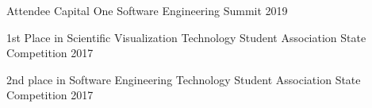 




\begin{cvhonors}

  \cvhonor
    {Attendee} %
    {Capital One Software Engineering Summit} %
    {} %
    {2019} %

  \cvhonor
    {1st Place in Scientific Visualization} %
    {Technology Student Association State Competition} %
    {} %
    {2017} %

  \cvhonor
    {2nd place in Software Engineering} %
    {Technology Student Association State Competition} %
    {} %
    {2017} %

\end{cvhonors}

